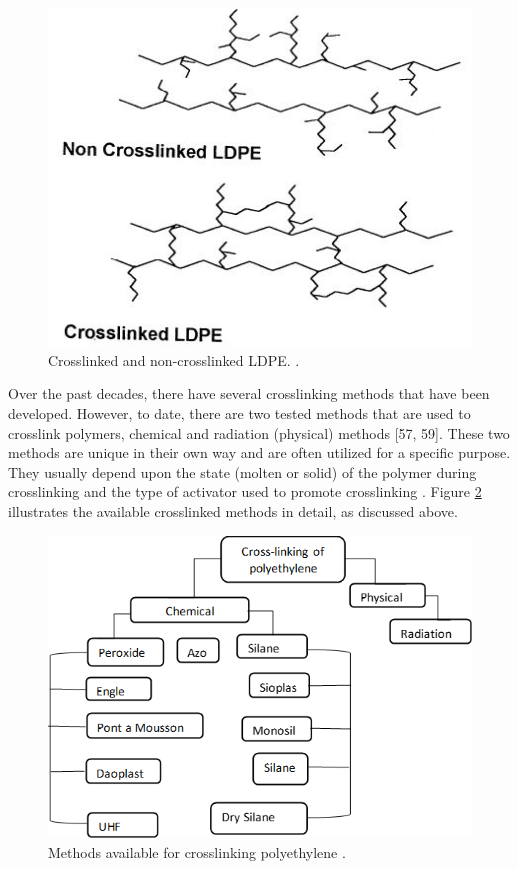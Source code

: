 \documentclass[12pt]{report}
\begin{document}
\begin{figure}[H]
    \centering
    \includegraphics[width=.6\textwidth]{crosslinked_and_non_crosslinked_ldpe.jpg}
    \caption{Crosslinked and non-crosslinked LDPE. \cite{kurtz2009cross}.}
    \label{ch3:figure:ldpe}
\end{figure}

Over the past decades, there have several crosslinking methods that have been developed. However, to date, there are two tested methods that are used to crosslink polymers, chemical and radiation (physical) methods [57, 59]. These two methods are unique in their own way and are often utilized for a specific purpose. They usually depend upon the state (molten or solid) of the polymer during crosslinking and the type of activator used to promote crosslinking \cite{kurtz2009cross}. Figure \ref{ch3:figure:crosslinking_methods} illustrates the available crosslinked methods in detail, as discussed above.

\begin{figure}[H]
    \centering
    \includegraphics[width=.75\textwidth]{methods_available_for_crosslinking_polyethylene.png}
    \caption{Methods available for crosslinking polyethylene \cite{patterson2022cross}.}
    \label{ch3:figure:crosslinking_methods}
\end{figure}
\end{document}
